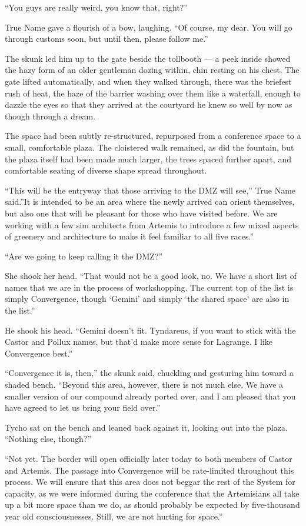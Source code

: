 ``You guys are really weird, you know that, right?''

True Name gave a flourish of a bow, laughing. ``Of course, my dear. You will go through customs soon, but until then, please follow me.''

The skunk led him up to the gate beside the tollbooth — a peek inside showed the hazy form of an older gentleman dozing within, chin resting on his chest. The gate lifted automatically, and when they walked through, there was the briefest rush of heat, the haze of the barrier washing over them like a waterfall, enough to dazzle the eyes so that they arrived at the courtyard he knew so well by now as though through a dream.

The space had been subtly re-structured, repurposed from a conference space to a small, comfortable plaza. The cloistered walk remained, as did the fountain, but the plaza itself had been made much larger, the trees spaced further apart, and comfortable seating of diverse shape spread throughout.

``This will be the entryway that those arriving to the DMZ will see,'' True Name said.''It is intended to be an area where the newly arrived can orient themselves, but also one that will be pleasant for those who have visited before. We are working with a few sim architects from Artemis to introduce a few mixed aspects of greenery and architecture to make it feel familiar to all five races.''

``Are we going to keep calling it the DMZ?''

She shook her head. ``That would not be a good look, no. We have a short list of names that we are in the process of workshopping. The current top of the list is simply Convergence, though `Gemini' and simply `the shared space' are also in the list.''

He shook his head. ``Gemini doesn't fit. Tyndareus, if you want to stick with the Castor and Pollux names, but that'd make more sense for Lagrange. I like Convergence best.''

``Convergence it is, then,'' the skunk said, chuckling and gesturing him toward a shaded bench. ``Beyond this area, however, there is not much else. We have a smaller version of our compound already ported over, and I am pleased that you have agreed to let us bring your field over.''

Tycho sat on the bench and leaned back against it, looking out into the plaza. ``Nothing else, though?''

``Not yet. The border will open officially later today to both members of Castor and Artemis. The passage into Convergence will be rate-limited throughout this process. We will ensure that this area does not beggar the rest of the System for capacity, as we were informed during the conference that the Artemisians all take up a bit more space than we do, as should probably be expected by five-thousand year old consciousnesses. Still, we are not hurting for space.''

